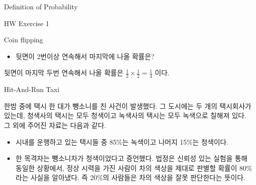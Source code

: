 \begin{edXchapter}{Definition of Probability}
\begin{edXsection}{HW Exercise 1}
\begin{edXvertical}
\begin{edXproblem}{Coin flipping}
\begin{itemize}
\begin{edXsolution}
먼저 k개의 문자열이 4개 이상의 연속된 H를 포함하지 않을 확률을 $P_k$라 정의해 두자.
이 문자열이 시작하는 방법은 다음 4가지가 있다.
\begin{enumerate}
\item T
\item HT
\item HHT
\item HHHT
\end{enumerate}
(주의: 이 네가지 방법들이 우리가 원하는 모든 경우를 나타내고 네 방법은 서로 겹치지 않음에 유의하자.)
(1)의 경우에 n개의 문자열이 4개 이상의 연속된 H를 포함하지 않으려면 T를 제외한 나머지 n-1 개의 문자열이
4개 이상의 연속된 H를 포함하지 않으면 된다. 첫번째에 T가 될 확률은 $\frac{1}{2}$이므로 (1)의 형태이고
n개의 문자열이 4개 이상 연속된 H를 포함하지 않을 확률은 $\frac{1}{2}P_{n-1}$이다. 

다른 경우들도 마찬가지로 생각하며 (2)의 경우 $\frac{1}{4}P_{n-2}$, (3)의 경우 $\frac{1}{8}P_{n-3}$,
(4)의 경우 $\frac{1}{16}P_{n-4}$이다. 따라서,
$P_n = \frac{1}{2}P_{n-1} + \frac{1}{4}P_{n-2} + \frac{1}{8}P_{n-3} + \frac{1}{16}P_{n-4}$ (n>=5)

$P_1 = P_2 = P_3 = 1$, $P4=\frac{15}{16}$이므로 $P_5 = \frac{1}{2}\times\frac{15}{16} + \frac{1}{4}\times1 + \frac{1}{8}\times1 + \frac{1}{16}\times1 = \frac{29}{32}$
마찬가지로 $P_6$, $P_7$, ..., $P_{10}$을 구할 수 있다.
우리가 구하는 확률은 $1-P_{10} = \frac{251}{1024}$.
\end{edXsolution}
\item 뒷면이 2번이상 연속해서 마지막에 나올 확률은? 
\end{itemize}
\begin{edXsolution}
뒷면이 마지막 두번 연속해서 나올 확률은 $\frac{1}{2} \times \frac{1}{2} = \frac{1}{4}$ 이다.
\end{edXsolution}
\end{edXproblem}

\begin{edXproblem}{Hit-And-Run Taxi}

한밤 중에 택시 한 대가 뺑소니를 친 사건이 발생했다. 그 도시에는 두 개의 택시회사가 있는데,
청색사의 택시는 모두 청색이고 녹색사의 택시는 모두 녹색으로 칠해져 있다. 그 외에 주어진 
자료는 다음과 같다.
\begin{itemize}
\item 시내를 운행하고 있는 택시들 중 85\%는 녹색이고 나머지 15\%는 청색이다.
\item 한 목격자는 뺑소니차가 청색이었다고 증언했다. 법정은 신뢰성 있는 실험을 통해 동일한 상황에서,
정상 시력을 가진 사람이 차의 색상을 제대로 판별할 확률이 80\%라는 사실을 알아냈다. 즉 20\%의
사람들은 차의 색상을 잘못 판단한다는 뜻이다.
\end{itemize}


\end{edXproblem}
\end{edXvertical}
\end{edXsection}
\end{edXchapter}
